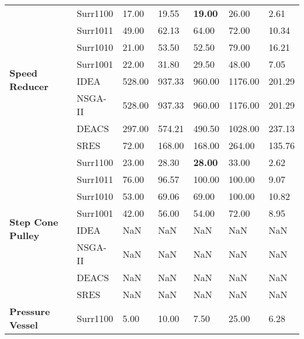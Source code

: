 \begin{table*}[!htb]
\begin{tabular}{lllllll}
		\multirow{8}{*}{\textbf{Speed Reducer}}     & Surr1100      & 17.00         & 19.55         & \textbf{19.00}  & 26.00          & 2.61         \\ 
		& Surr1011      & 49.00         & 62.13         & 64.00           & 72.00          & 10.34        \\  
		& Surr1010      & 21.00         & 53.50         & 52.50           & 79.00          & 16.21        \\ 
		& Surr1001      & 22.00         & 31.80         & 29.50           & 48.00          & 7.05         \\  
		& IDEA          & 528.00        & 937.33        & 960.00          & 1176.00        & 201.29       \\  
		& NSGA-II       & 528.00        & 937.33        & 960.00          & 1176.00        & 201.29       \\ 
		& DEACS         & 297.00        & 574.21        & 490.50          & 1028.00        & 237.13       \\  
		& SRES          & 72.00         & 168.00        & 168.00          & 264.00         & 135.76       \\ \hline
		\multirow{8}{*}{\textbf{Step Cone Pulley}}  & Surr1100      & 23.00         & 28.30         & \textbf{28.00}  & 33.00          & 2.62         \\  
		& Surr1011      & 76.00         & 96.57         & 100.00          & 100.00         & 9.07         \\  
		& Surr1010      & 53.00         & 69.06         & 69.00           & 100.00         & 10.82        \\
		& Surr1001      & 42.00         & 56.00         & 54.00           & 72.00          & 8.95         \\ 
		& IDEA          & NaN           & NaN           & NaN             & NaN            & NaN          \\  
		& NSGA-II       & NaN           & NaN           & NaN             & NaN            & NaN          \\  
		& DEACS         & NaN           & NaN           & NaN             & NaN            & NaN          \\  
		& SRES          & NaN           & NaN           & NaN             & NaN            & NaN          \\ \hline
		\multirow{8}{*}{\textbf{Pressure Vessel}}   & Surr1100      & 5.00          & 10.00         & 7.50            & 25.00          & 6.28         \\ 

\end{tabular}
\end{table*}
